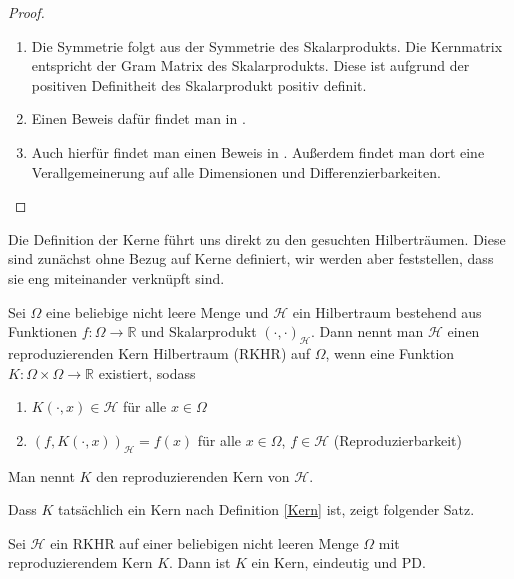 \begin{proof}
$\mbox{}$
\begin{enumerate}
\item
Die Symmetrie folgt aus der Symmetrie des Skalarprodukts. Die Kernmatrix entspricht der Gram Matrix des Skalarprodukts. Diese ist aufgrund der positiven Definitheit des Skalarprodukt positiv definit. 
\item
Einen Beweis dafür findet man in \textcite[Theorem 6.10]{Wendland.2005}.
\item
Auch hierfür findet man einen Beweis in \textcite[Theorem 9.13]{Wendland.2005}. Außerdem findet man dort eine Verallgemeinerung auf alle Dimensionen und Differenzierbarkeiten.
\end{enumerate}
\end{proof}

Die Definition der Kerne führt uns direkt zu den gesuchten Hilberträumen. Diese sind zunächst ohne Bezug auf Kerne definiert, wir werden aber feststellen, dass sie eng miteinander verknüpft sind.

\begin{definition}
Sei $\Omega$ eine beliebige nicht leere Menge und $\mathcal{H}$ ein Hilbertraum bestehend aus Funktionen $f:\Omega \rightarrow \mathbb{R}$ und Skalarprodukt $(\cdot, \cdot)_\mathcal{H}$. Dann nennt man $\mathcal{H}$ einen reproduzierenden Kern Hilbertraum (\acs{RKHR}) auf $\Omega$, wenn eine Funktion $K:\Omega \times \Omega \rightarrow \mathbb{R}$ existiert, sodass
\begin{enumerate}
\item $K(\cdot, x) \in \mathcal{H}$ für alle $x \in \Omega$
\item $(f, K(\cdot,x))_\mathcal{H} = f(x)$ für alle $ x \in \Omega$, $f \in \mathcal{H}$ (Reproduzierbarkeit)
\end{enumerate}
Man nennt $K$ den reproduzierenden Kern von $\mathcal{H}$.
\end{definition}

Dass $K$ tatsächlich ein Kern nach Definition \ref{Kern} ist, zeigt folgender Satz.
\begin{theorem}
\label{thm:EindeutigkeitKern}
Sei $\mathcal{H}$ ein \gls{RKHR} auf einer beliebigen nicht leeren Menge $\Omega$ mit reproduzierendem Kern $K$. Dann ist $K$ ein Kern, eindeutig und \ac{PD}.
\end{theorem}

